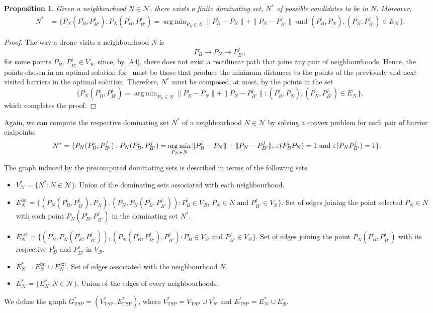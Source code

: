 \documentclass[a4paper,  review, authoryear, 1p.]{elsarticle}
\DeclareMathOperator*{\argmin}{arg\,min}
\newcommand{\TSPN}{{\sf{H-TSPN}\xspace }}
\newcommand{\VB}{{V^{}_{\mathcal B}}}
\newcommand{\EB}{{E^{}_{\mathcal B}}}
\newcommand{\EN}{{E^{}_{\mathcal N}}}
\newcommand{\VTSP}{{V_{\text{TSP}}}}
\newcommand{\GTSPS}{{G^{*}_{\text{TSP}}}}
\newcommand{\VTSPS}{{V^{*}_{\text{TSP}}}}
\newcommand{\ETSPS}{{E^{*}_{\text{TSP}}}}
\newtheorem{prop}{Proposition}
\begin{document}
		\begin{prop}
			Given a neighbourhood $N\in\mathcal N$, there exists a finite dominating set, $N^*$ of possible candidates to be in $N$. Moreover,
			\begin{align*}
				N^*&=\{P_N(P_{B}^i, P_{B'}^j):P_N(P_{B}^i, P_{B'}^j)=\argmin_{P_N\in N} \|P_B^i - P_N\| + \|P_N - P_{B'}^j\|\text{ and }(P_B^i, P_N), (P_N, P_{B'}^j)\in \EN\}.
			\end{align*}
		\end{prop}
		\begin{proof}
			The way a drone visits a neighbourhood $N$ is
			$$P_{B}^i\longrightarrow P_N\longrightarrow P_{B'}^j,$$
			for some points $P_B^i,\, P_{B'}^j\in \VB$, since, by \ref{A4}, there does not exist a rectilinear path that joins any pair of neighbourhoods. Hence, the points chosen in an optimal solution for \TSPN \ must be those that produce the minimum distances to the points of the previously and next visited barriers in the optimal solution. Therefore, $N^*$ must be composed, at most, by the points in the set
			$$
			\{P_N(P_{B}^i, P_{B'}^j)=\argmin_{P_N\in N} \|P_B^i - P_N\| + \|P_N - P_{B'}^j\| :(P_B^i, P_N), (P_N, P_{B'}^j)\in \EN\},
			$$
			which completes the proof.
		\end{proof}
		Again, we can compute the respective dominating set $N^*$ of a neighbourhood $N\in\mathcal N$ by solving a convex problem for each pair of barrier endpoints: %
		\begin{align*}
			N^*&=\{P_N(P_{B}^i, P_{B'}^j):P_N(P_{B}^i, P_{B'}^j)=\argmin_{P_N\in N} \|P_B^i - P_N\| + \|P_N - P_{B'}^j\|,\,\varepsilonvar{P_B^i}{P_N} = 1 \text{ and } \varepsilonvar{P_N}{P_{B'}^j} = 1\}.
		\end{align*}
		
		
		The  graph induced by the precomputed dominating sets is described in terms of the following sets
		\begin{itemize}
			\item $V_\mathcal N^*=\{N^*:N\in\mathcal N\}$. Union of the dominating sets associated with each neighbourhood.
			\item $E_N^{\text{int}}=\{(P_N(P_B^i, P_{B'}^j), P_N), (P_N, P_N(P_B^i, P_{B'}^j)) :P_B^i\in\VB,\,P_N\in N\text{ and }P_{B'}^j\in\VB\}.$ Set of edges joining the point selected $P_N\in N$ with each point $P_N(P_B^i, P_{B'}^j)$ in the dominating set $N^*$.
			\item $E_N^{\text{ext}}=\{(P_B^i, P_N(P_B^i, P_{B'}^j)), (P_N(P_B^i, P_{B'}^j), P_{B'}^j):P_B^i\in\VB\text{ and }P_{B'}^j\in\VB\}.$ Set of edges joining the point $P_N(P_B^i, P_{B'}^j)$ with its respective $P_B^i$ and $P_{B'}^j$ in $\VB$.
			\item $E_N^*=E_N^{\text{int}}\cup E_N^{\text{ext}}$. Set of edges associated with the neighbourhood $N$.
			\item $E_\mathcal N^*= \{E_N^*:N\in\mathcal N\}.$ Union of the edges of every neighbourhoods.
		\end{itemize}
		We define the graph $\GTSPS=(\VTSPS, \ETSPS)$, where $\VTSPS=\VTSP\cup V^*_\mathcal N$ and $\ETSPS=E^*_\mathcal N\cup\EB$.
		
\end{document}
